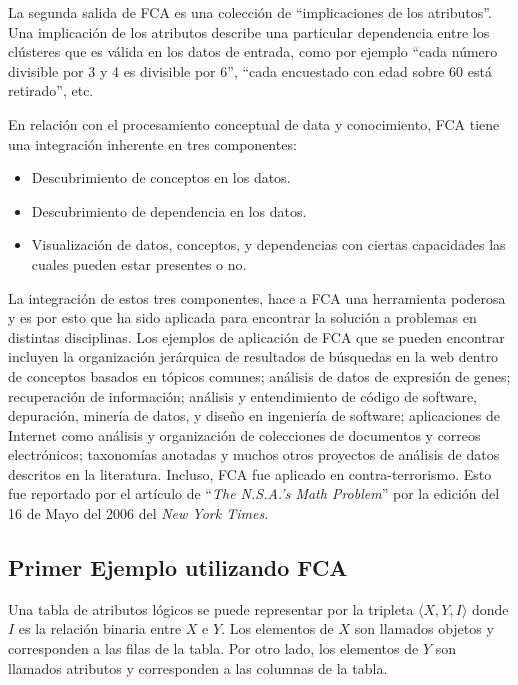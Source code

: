 \documentclass[12pt,oneside,letterpaper]{book}
\newcommand{\eng}[1]{\textit{#1}\xspace}			%
\newcommand{\abr}[1]{\textsc{#1}\xspace}           %
\theoremstyle{definition}
\begin{document}
La segunda salida de \abr{FCA} es una colección de ``implicaciones de los atributos''. Una implicación de los atributos describe una particular dependencia entre los clústeres que es válida en los datos de entrada, como por ejemplo ``cada número divisible por 3 y 4 es divisible por 6'', ``cada encuestado con edad sobre 60 está retirado'', etc.

En relación con el procesamiento conceptual de data y conocimiento, \abr{FCA} tiene una integración inherente en tres componentes:
\begin{itemize}
\setlength{\itemindent}{.1in}
	\item Descubrimiento de conceptos en los datos.
	\item Descubrimiento de dependencia en los datos.
	\item Visualización de datos, conceptos, y dependencias con ciertas capacidades las cuales pueden estar presentes o no.
\end{itemize}

La integración de estos tres componentes, hace a \abr{FCA} una herramienta poderosa y es por esto que ha sido aplicada para encontrar la solución a problemas en distintas disciplinas. Los ejemplos de aplicación de \abr{FCA} que se pueden encontrar incluyen la organización jerárquica de resultados de búsquedas en la web dentro de conceptos basados en tópicos comunes; análisis de datos de expresión de genes; recuperación de información; análisis y entendimiento de código de software, depuración, minería de datos, y diseño en ingeniería de software; aplicaciones de Internet como análisis y organización de colecciones de documentos y correos electrónicos; taxonomías anotadas y muchos otros proyectos de análisis de datos descritos en la literatura. Incluso, \abr{FCA} fue aplicado en contra-terrorismo. Esto fue reportado por el artículo de ``\eng{The N.S.A.’s Math Problem}'' por la edición del 16 de Mayo del 2006 del \eng{New York Times}.

\subsection{Primer Ejemplo utilizando \abr{FCA}} %
\label{sub:primer_ejemplo}
Una tabla de atributos lógicos se puede representar por la tripleta $\langle X,Y,I \rangle$ donde $I$ es la relación binaria entre $X$ e $Y$. Los elementos de $X$ son llamados objetos y corresponden a las filas de la tabla. Por otro lado, los elementos de $Y$ son llamados atributos y corresponden a las columnas de la tabla.
\end{document}

